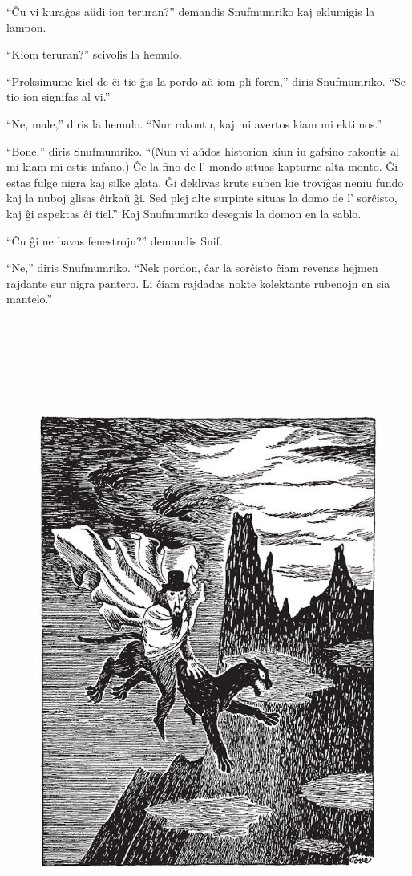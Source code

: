 ``Ĉu vi kuraĝas aŭdi ion teruran?'' demandis Snufmumriko kaj eklumigis la lampon.

``Kiom teruran?'' scivolis la hemulo.

``Proksimume kiel de ĉi tie ĝis la pordo aŭ iom pli foren,'' diris Snufmumriko. ``Se tio ion signifas al vi.''

``Ne, male,'' diris la hemulo. ``Nur rakontu, kaj mi avertos kiam mi ektimos.''

``Bone,'' diris Snufmumriko. ``(Nun vi aŭdos historion kiun iu gafsino rakontis al mi kiam mi estis infano.) Ĉe la fino de l' mondo situas kapturne alta monto. Ĝi estas fulge nigra kaj silke glata. Ĝi deklivas krute suben kie troviĝas neniu fundo kaj la nuboj glisas ĉirkaŭ ĝi. Sed plej alte surpinte situas la domo de l' sorĉisto, kaj ĝi aspektas ĉi tiel.'' Kaj Snufmumriko desegnis la domon en la sablo.

``Ĉu ĝi ne havas fenestrojn?'' demandis Snif.

``Ne,'' diris Snufmumriko. ``Nek pordon, ĉar la sorĉisto ĉiam revenas hejmen rajdante sur nigra pantero. Li ĉiam rajdadas nokte kolektante rubenojn en sia mantelo.''

\begin{figure}[htbp]
\centering
\includegraphics[width=450pt,height=604pt]{_23.jpg}
\caption{}
\label{_23}
\end{figure}

